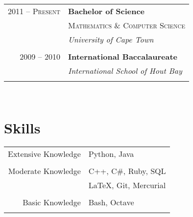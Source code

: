 \documentclass[a4paper,10pt]{article} %
\begin{document}
\begin{minipage}[t]{0.5\textwidth}
\begin{tabular}{rl}

2011 -- \textsc{Present} & \textbf{Bachelor of Science} \\ 
& \textsc{Mathematics \& Computer Science} \\ 
& \textit{University of Cape Town}\\
&\\
	 

2009 -- 2010 & \textbf{International Baccalaureate} \\ 
& \textit{International School of Hout Bay}\\
&\\
	 

\end{tabular}\\[10pt]


\section{ Skills} 

\begin{tabular}{rl}
Extensive Knowledge
& Python, Java \\
& \\
Moderate Knowledge
& C++, C\#, Ruby, SQL\\
& \LaTeX, Git, Mercurial \\
& \\
Basic Knowledge
& Bash, Octave \\
& \\
\end{tabular}




\end{minipage}
\end{document}
